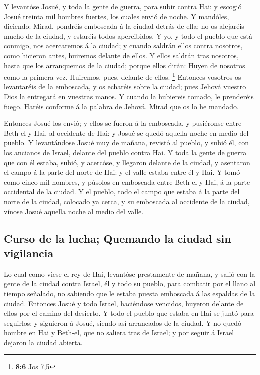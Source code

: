  Y levantóse Josué, y toda la gente de guerra, para subir
contra Hai: y escogió Josué treinta mil hombres fuertes, los cuales
envió de noche.  Y mandóles, diciendo: Mirad, pondréis
emboscada á la ciudad detrás de ella: no os alejaréis mucho de la
ciudad, y estaréis todos apercibidos.  Y yo, y todo el
pueblo que está conmigo, nos acercaremos á la ciudad; y cuando saldrán
ellos contra nosotros, como hicieron antes, huiremos delante de ellos.
 Y ellos saldrán tras nosotros, hasta que los arranquemos
de la ciudad; porque ellos dirán: Huyen de nosotros como la primera vez.
Huiremos, pues, delante de ellos. \footnote{\textbf{8:6} Jos 7,5}
 Entonces vosotros os levantaréis de la emboscada, y os
echaréis sobre la ciudad; pues Jehová vuestro Dios la entregará en
vuestras manos.  Y cuando la hubiereis tomado, le
prenderéis fuego. Haréis conforme á la palabra de Jehová. Mirad que os
lo he mandado.

 Entonces Josué los envió; y ellos se fueron á la
emboscada, y pusiéronse entre Beth-el y Hai, al occidente de Hai: y
Josué se quedó aquella noche en medio del pueblo.  Y
levantándose Josué muy de mañana, revistó al pueblo, y subió él, con los
ancianos de Israel, delante del pueblo contra Hai.  Y
toda la gente de guerra que con él estaba, subió, y acercóse, y llegaron
delante de la ciudad, y asentaron el campo á la parte del norte de Hai:
y el valle estaba entre él y Hai.  Y tomó como cinco mil
hombres, y púsolos en emboscada entre Beth-el y Hai, á la parte
occidental de la ciudad.  Y el pueblo, todo el campo que
estaba á la parte del norte de la ciudad, colocado ya cerca, y su
emboscada al occidente de la ciudad, vínose Josué aquella noche al medio
del valle.

\hypertarget{curso-de-la-lucha-quemando-la-ciudad-sin-vigilancia}{%
\subsection{Curso de la lucha; Quemando la ciudad sin
vigilancia}\label{curso-de-la-lucha-quemando-la-ciudad-sin-vigilancia}}

 Lo cual como viese el rey de Hai, levantóse prestamente
de mañana, y salió con la gente de la ciudad contra Israel, él y todo su
pueblo, para combatir por el llano al tiempo señalado, no sabiendo que
le estaba puesta emboscada á las espaldas de la ciudad. 
Entonces Josué y todo Israel, haciéndose vencidos, huyeron delante de
ellos por el camino del desierto.  Y todo el pueblo que
estaba en Hai se juntó para seguirlos: y siguieron á Josué, siendo así
arrancados de la ciudad.  Y no quedó hombre en Hai y
Beth-el, que no saliera tras de Israel; y por seguir á Israel dejaron la
ciudad abierta.

